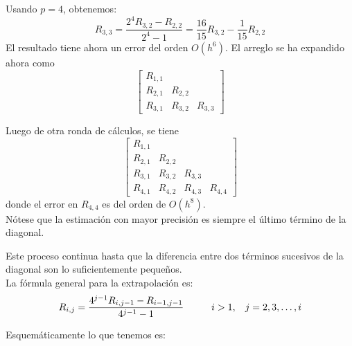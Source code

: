 \begin{frame}
Usando $p=4$, obtenemos:
\[ R_{3,3} = \dfrac{2^{4}R_{3,2}-R_{2,2}}{2^{4}-1} = \dfrac{16}{15} R_{3,2} - \dfrac{1}{15}R_{2,2} \]
El resultado tiene ahora un error del orden $O(h^{6})$. El arreglo se ha expandido ahora como
\[ \begin{bmatrix}
R_{1,1} &  & \\
R_{2,1} & R_{2,2} & \\
R_{3,1} & R_{3,2} & R_{3,3}
\end{bmatrix} \]
\end{frame}
\begin{frame}
Luego de otra ronda de c\'{a}lculos, se tiene
\[ \begin{bmatrix}
R_{1,1} &  & & \\
R_{2,1} & R_{2,2} & & \\
R_{3,1} & R_{3,2} & R_{3,3} & \\
R_{4,1} & R_{4,2} & R_{4,3} & R_{4,4}
\end{bmatrix} \]
donde el error en $R_{4,4}$ es del orden de $O(h^{8})$.
\\
\bigskip
N\'{o}tese que la estimaci\'{o}n con mayor precisi\'{o}n es siempre el \'{u}ltimo t\'{e}rmino de la diagonal.
\end{frame}
\begin{frame}
Este proceso continua hasta que la diferencia entre dos t\'{e}rminos sucesivos de la diagonal son lo suficientemente pequeños.
\\
\bigskip
La f\'{o}rmula general para la extrapolaci\'{o}n es:
\[ R_{i,j} = \dfrac{4^{j-1} R_{i,j-1} - R_{i-1,j-1} }{4^{j-1}-1} \hspace{1cm} i>1, \hspace{0.3cm} j=2,3,\ldots,i \]
\end{frame}
\begin{frame}
Esquem\'{a}ticamente lo que tenemos es:
\begin{center}
\begin{tikzpicture}

\end{tikzpicture}
\end{center}
\end{frame}
